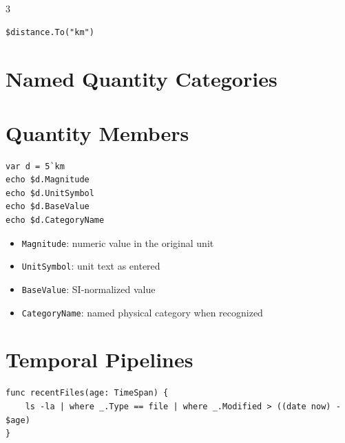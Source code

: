 \begin{multicols*}{3}
\begin{lstlisting}
$distance.To("km")
\end{lstlisting}


\section{Named Quantity Categories}

\section{Quantity Members}
\begin{lstlisting}
var d = 5`km
echo $d.Magnitude
echo $d.UnitSymbol
echo $d.BaseValue
echo $d.CategoryName
\end{lstlisting}

\begin{itemize}
\item \texttt{Magnitude}: numeric value in the original unit
\item \texttt{UnitSymbol}: unit text as entered
\item \texttt{BaseValue}: SI-normalized value
\item \texttt{CategoryName}: named physical category when recognized
\end{itemize}

\columnbreak

\section{Temporal Pipelines}
\begin{lstlisting}
func recentFiles(age: TimeSpan) {
    ls -la | where _.Type == file | where _.Modified > ((date now) - $age)
}


\end{lstlisting}
\end{multicols*}
